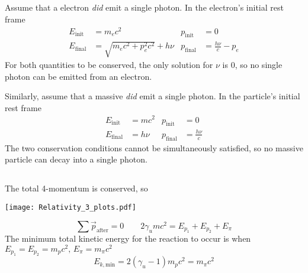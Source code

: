 \documentclass[12pt]{article}
\begin{document}
        \subsection{} Assume that a electron \emph{did} emit a single photon. In the electron's initial rest frame \begin{align*}
            E_\text{init} &= m_e c^2&
            p_\text{init} &= 0\\
            E_\text{final} &= \sqrt{m_e c^2 + p_e^2c^2} + h\nu&
            p_\text{final} &= \frac{h\nu}{c} - p_e 
        \end{align*}
        For both quantities to be conserved, the only solution for \(\nu\) is \(0\), so no single photon can be emitted from an electron.

        Similarly, assume that a massive \emph{did} emit a single photon. In the particle's initial rest frame \begin{align*}
            E_\text{init} &= m c^2&
            p_\text{init} &= 0\\
            E_\text{final} &= h\nu&
            p_\text{final} &= \frac{h\nu}{c}
        \end{align*}
        The two conservation conditions cannot be simultaneously satisfied, so no massive particle can decay into a single photon.
        \subsection{} \subsubsection{}
        The total 4-momentum is conserved, so
        \begin{center}
            \texttt{[image: Relativity\_3\_plots.pdf]}
        \end{center}
        \[
            \sum \vec{p}_\text{after} = 0\qquad 2\gamma_u mc^2 = E_{p_1}+ E_{p_2} + E_\pi
        \]
        The minimum total kinetic energy for the reaction to occur is when \(E_{p_1} = E_{p_2} = m_pc^2,\, E_\pi = m_\pi c^2\)\[
            E_{k,\text{min}} = 2 (\gamma_u - 1)m_pc^2 = m_\pi c^2
        \]
\end{document}
